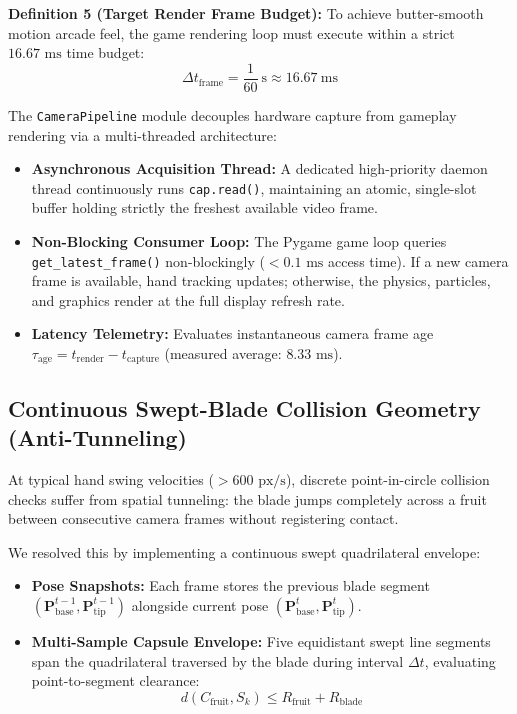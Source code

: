 \documentclass[11pt,a4paper]{article}
\begin{document}
\begin{FormulaCard}
\textbf{\color{NavyPrimary}Definition 5 (Target Render Frame Budget):} To achieve butter-smooth motion arcade feel, the game rendering loop must execute within a strict $16.67\text{ ms}$ time budget:
{\large
\begin{equation}
\Delta t_{\mathrm{frame}} = \frac{1}{60}\ \mathrm{s} \approx 16.67\ \mathrm{ms}
\label{eq:frame_budget}
\end{equation}
}
\end{FormulaCard}

The \texttt{CameraPipeline} module decouples hardware capture from gameplay rendering via a multi-threaded architecture:
\begin{itemize}[leftmargin=1.5em, itemsep=2pt, topsep=2pt]
  \item \textbf{Asynchronous Acquisition Thread:} A dedicated high-priority daemon thread continuously runs \texttt{cap.read()}, maintaining an atomic, single-slot buffer holding strictly the freshest available video frame.
  \item \textbf{Non-Blocking Consumer Loop:} The Pygame game loop queries \texttt{get\_latest\_frame()} non-blockingly ($< 0.1\text{ ms}$ access time). If a new camera frame is available, hand tracking updates; otherwise, the physics, particles, and graphics render at the full display refresh rate.
  \item \textbf{Latency Telemetry:} Evaluates instantaneous camera frame age $\tau_{\mathrm{age}} = t_{\mathrm{render}} - t_{\mathrm{capture}}$ (measured average: $8.33\text{ ms}$).
\end{itemize}

\subsection{Continuous Swept-Blade Collision Geometry (Anti-Tunneling)}
At typical hand swing velocities ($> 600\text{ px/s}$), discrete point-in-circle collision checks suffer from spatial tunneling: the blade jumps completely across a fruit between consecutive camera frames without registering contact.

We resolved this by implementing a continuous swept quadrilateral envelope:
\begin{itemize}[leftmargin=1.5em, itemsep=2pt, topsep=2pt]
  \item \textbf{Pose Snapshots:} Each frame stores the previous blade segment $(\mathbf{P}_{\mathrm{base}}^{t-1}, \mathbf{P}_{\mathrm{tip}}^{t-1})$ alongside current pose $(\mathbf{P}_{\mathrm{base}}^t, \mathbf{P}_{\mathrm{tip}}^t)$.
  \item \textbf{Multi-Sample Capsule Envelope:} Five equidistant swept line segments span the quadrilateral traversed by the blade during interval $\Delta t$, evaluating point-to-segment clearance:
  \[
    d(C_{\mathrm{fruit}}, S_k) \le R_{\mathrm{fruit}} + R_{\mathrm{blade}}
  \]
\end{itemize}
\end{document}
